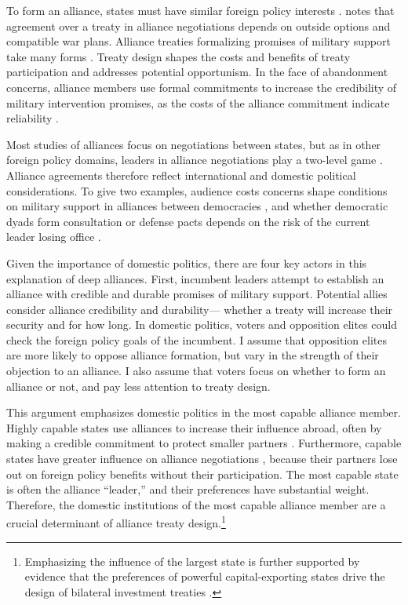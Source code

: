 \documentclass[12pt]{article}
\begin{document}
To form an alliance, states must have similar foreign policy interests \citep{Morrow1991, Smith1995, FordhamPoast2014}. 
\citet{Poast2019a} notes that agreement over a treaty in alliance negotiations depends on outside options and compatible war plans. 
Alliance treaties formalizing promises of military support take many forms \citep{Leedsetal2002, BensonClinton2016}. 
Treaty design shapes the costs and benefits of treaty participation and addresses potential opportunism.  
In the face of abandonment concerns, alliance members use formal commitments to increase the credibility of military intervention promises, as the costs of the alliance commitment indicate reliability \citep{Morrow2000}.


Most studies of alliances focus on negotiations between states, but as in other foreign policy domains, leaders in alliance negotiations play a two-level game \citep{Putnam1988}. 
Alliance agreements therefore reflect international and domestic political considerations. 
To give two examples, audience costs concerns shape conditions on military support in alliances between democracies \citep{Chibaetal2015, FjelstulReiter2019}, and whether democratic dyads form consultation or defense pacts depends on the risk of the current leader losing office \citep{Mattes2012a}. 


Given the importance of domestic politics, there are four key actors in this explanation of deep alliances. 
First, incumbent leaders attempt to establish an alliance with credible and durable promises of military support. 
Potential allies consider alliance credibility and durability--- whether a treaty will increase their security and for how long. 
In domestic politics, voters and opposition elites could check the foreign policy goals of the incumbent. 
I assume that opposition elites are more likely to oppose alliance formation, but vary in the strength of their objection to an alliance. 
I also assume that voters focus on whether to form an alliance or not, and pay less attention to treaty design.


This argument emphasizes domestic politics in the most capable alliance member. 
Highly capable states use alliances to increase their influence abroad, often by making a credible commitment to protect smaller partners \citep{Morrow1994}. 
Furthermore, capable states have greater influence on alliance negotiations \citep{Mattes2012}, because their partners lose out on foreign policy benefits without their participation.
The most capable state is often the alliance ``leader,'' and their preferences have substantial weight. 
Therefore, the domestic institutions of the most capable alliance member are a crucial determinant of alliance treaty design.\footnote{Emphasizing the influence of the largest state is further supported by evidence that the preferences of powerful capital-exporting states drive the design of bilateral investment treaties \citep{AlleePeinhardt2014}.} 
\end{document}
